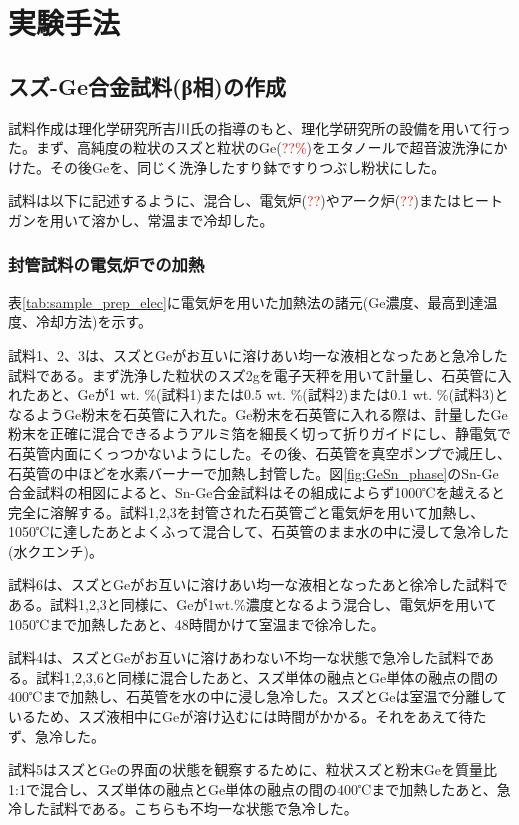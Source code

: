 \section{実験手法}
\subsection{スズ-Ge合金試料(β相)の作成}
試料作成は理化学研究所吉川氏の指導のもと、理化学研究所の設備を用いて行った。まず、高純度の粒状のスズと粒状のGe(\textcolor{red}{??\%})をエタノールで超音波洗浄にかけた。その後Geを、同じく洗浄したすり鉢ですりつぶし粉状にした。

試料は以下に記述するように、混合し、電気炉(\textcolor{red}{??})やアーク炉(\textcolor{red}{??})またはヒートガンを用いて溶かし、常温まで冷却した。

\subsubsection{封管試料の電気炉での加熱}
表\ref{tab:sample_prep_elec}に電気炉を用いた加熱法の諸元(Ge濃度、最高到達温度、冷却方法)を示す。

試料1、2、3は、スズとGeがお互いに溶けあい均一な液相となったあと急冷した試料である。まず洗浄した粒状のスズ2gを電子天秤を用いて計量し、石英管に入れたあと、Geが1 wt. \%(試料1)または0.5 wt. \%(試料2)または0.1 wt. \%(試料3)となるようGe粉末を石英管に入れた。Ge粉末を石英管に入れる際は、計量したGe粉末を正確に混合できるようアルミ箔を細長く切って折りガイドにし、静電気で石英管内面にくっつかないようにした。その後、石英管を真空ポンプで減圧し、石英管の中ほどを水素バーナーで加熱し封管した。図\ref{fig:GeSn_phase}のSn-Ge合金試料の相図によると、Sn-Ge合金試料はその組成によらず1000℃を越えると完全に溶解する。試料1,2,3を封管された石英管ごと電気炉を用いて加熱し、1050℃に達したあとよくふって混合して、石英管のまま水の中に浸して急冷した(水クエンチ)。

試料6は、スズとGeがお互いに溶けあい均一な液相となったあと徐冷した試料である。試料1,2,3と同様に、Geが1wt.\%濃度となるよう混合し、電気炉を用いて1050℃まで加熱したあと、48時間かけて室温まで徐冷した。

試料4は、スズとGeがお互いに溶けあわない不均一な状態で急冷した試料である。試料1,2,3,6と同様に混合したあと、スズ単体の融点とGe単体の融点の間の400℃まで加熱し、石英管を水の中に浸し急冷した。スズとGeは室温で分離しているため、スズ液相中にGeが溶け込むには時間がかかる。それをあえて待たず、急冷した。

試料5はスズとGeの界面の状態を観察するために、粒状スズと粉末Geを質量比1:1で混合し、スズ単体の融点とGe単体の融点の間の400℃まで加熱したあと、急冷した試料である。こちらも不均一な状態で急冷した。

